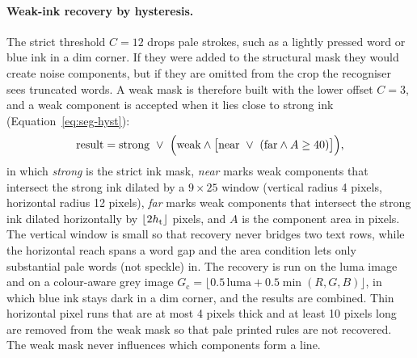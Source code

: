 \paragraph{Weak-ink recovery by hysteresis.}
The strict threshold $C=12$ drops pale strokes, such as a lightly pressed word or blue ink in a dim corner.
If they were added to the structural mask they would create noise components, but if they are omitted from the crop the recogniser sees truncated words.
A weak mask is therefore built with the lower offset $C=3$, and a weak component is accepted when it lies close to strong ink (Equation~\ref{eq:seg-hyst}):
\begin{equation}
\mathrm{result}=\mathrm{strong}\ \vee\ \Bigl(\mathrm{weak}\wedge\bigl[\mathrm{near}\ \vee\ (\mathrm{far}\wedge A\ge40)\bigr]\Bigr),
\label{eq:seg-hyst}
\end{equation}
in which \emph{strong} is the strict ink mask, \emph{near} marks weak components that intersect the strong ink dilated by a $9\times25$ window (vertical radius 4 pixels, horizontal radius 12 pixels), \emph{far} marks weak components that intersect the strong ink dilated horizontally by $\lfloor2h_{\mathrm{t}}\rfloor$ pixels, and $A$ is the component area in pixels.
The vertical window is small so that recovery never bridges two text rows, while the horizontal reach spans a word gap and the area condition lets only substantial pale words (not speckle) in.
The recovery is run on the luma image and on a colour-aware grey image $G_{\mathrm c}=\lfloor0.5\,\mathrm{luma}+0.5\min(R,G,B)\rfloor$, in which blue ink stays dark in a dim corner, and the results are combined.
Thin horizontal pixel runs that are at most 4 pixels thick and at least 10 pixels long are removed from the weak mask so that pale printed rules are not recovered.
The weak mask never influences which components form a line.


